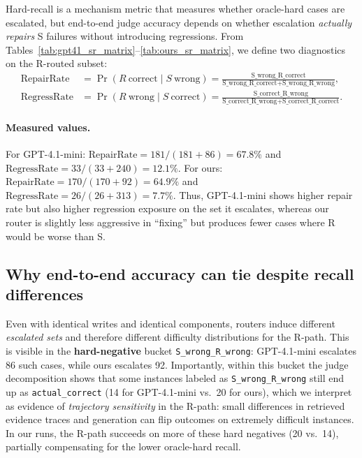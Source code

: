 \documentclass{article}
\theoremstyle{plain}
\theoremstyle{definition}
\theoremstyle{remark}
\begin{document}
Hard-recall is a mechanism metric that measures whether oracle-hard cases are escalated,
but end-to-end judge accuracy depends on whether escalation \emph{actually repairs} S failures without introducing regressions.
From Tables~\ref{tab:gpt41_sr_matrix}--\ref{tab:ours_sr_matrix}, we define two diagnostics on the R-routed subset:
\begin{align}
\mathrm{RepairRate} &= \Pr(R\ \text{correct} \mid S\ \text{wrong})
= \frac{\text{S\_wrong\_R\_correct}}{\text{S\_wrong\_R\_correct}+\text{S\_wrong\_R\_wrong}}, \\
\mathrm{RegressRate} &= \Pr(R\ \text{wrong} \mid S\ \text{correct})
= \frac{\text{S\_correct\_R\_wrong}}{\text{S\_correct\_R\_wrong}+\text{S\_correct\_R\_correct}}.
\end{align}

\paragraph{Measured values.}
For GPT-4.1-mini: $\mathrm{RepairRate}=181/(181+86)=67.8\%$ and $\mathrm{RegressRate}=33/(33+240)=12.1\%$.
For ours: $\mathrm{RepairRate}=170/(170+92)=64.9\%$ and $\mathrm{RegressRate}=26/(26+313)=7.7\%$.
Thus, GPT-4.1-mini shows higher repair rate but also higher regression exposure on the set it escalates,
whereas our router is slightly less aggressive in ``fixing'' but produces fewer cases where R would be worse than S.

\subsection{Why end-to-end accuracy can tie despite recall differences}
\label{app:router_tie_explanation}

Even with identical writes and identical components, routers induce different \emph{escalated sets} and therefore different
difficulty distributions for the R-path.
This is visible in the \textbf{hard-negative} bucket \texttt{S\_wrong\_R\_wrong}:
GPT-4.1-mini escalates 86 such cases, while ours escalates 92.
Importantly, within this bucket the judge decomposition shows that some instances labeled as \texttt{S\_wrong\_R\_wrong}
still end up as \texttt{actual\_correct} (14 for GPT-4.1-mini vs.\ 20 for ours), which we interpret as evidence of
\emph{trajectory sensitivity} in the R-path: small differences in retrieved evidence traces and generation can flip outcomes on extremely difficult instances.
In our runs, the R-path succeeds on more of these hard negatives (20 vs.\ 14), partially compensating for the lower oracle-hard recall.
\end{document}
